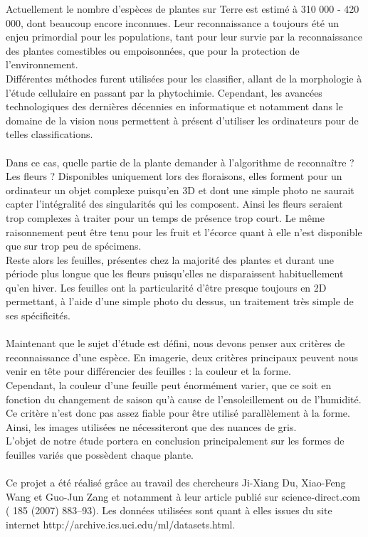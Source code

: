 Actuellement le nombre d'espèces de plantes sur Terre est estimé à 310 000 - 420 000, dont beaucoup encore inconnues. Leur reconnaissance a toujours été un enjeu primordial pour les populations, tant pour leur survie par la reconnaissance des plantes comestibles ou empoisonnées, que pour la protection de l'environnement. \\
Différentes méthodes furent utilisées pour les classifier, allant de la morphologie à l'étude cellulaire en passant par la phytochimie. Cependant, les avancées technologiques des dernières décennies en informatique et notamment dans le domaine de la vision nous permettent à présent d'utiliser les ordinateurs pour de telles classifications. \\
\\
Dans ce cas, quelle partie de la plante demander à l'algorithme de reconnaître ?
Les fleurs ? Disponibles uniquement lors des floraisons, elles forment pour un ordinateur un objet complexe puisqu'en 3D et dont une simple photo ne saurait capter l'intégralité des singularités qui les composent. Ainsi les fleurs seraient trop complexes à traiter pour un temps de présence trop court. 
Le même raisonnement peut être tenu pour les fruit et l'écorce quant à elle n'est disponible que sur trop peu de spécimens. \\
Reste alors les feuilles, présentes chez la majorité des plantes et durant une période plus longue que les fleurs puisqu'elles ne disparaissent habituellement qu'en hiver. Les feuilles ont la particularité d'être presque toujours en 2D permettant, à l'aide d'une simple photo du dessus, un traitement très simple de ses spécificités. \\
\\
Maintenant que le sujet d'étude est défini, nous devons penser aux critères de reconnaissance d'une espèce. En imagerie, deux critères principaux peuvent nous venir en tête pour différencier des feuilles : la couleur et la forme. \\
Cependant, la couleur d'une feuille peut énormément varier, que ce soit en fonction du changement de saison qu'à cause de l'ensoleillement ou de l'humidité. Ce critère n'est donc pas assez fiable pour être utilisé parallèlement à la forme. Ainsi, les images utilisées ne nécessiteront que des nuances de gris. \\
L'objet de notre étude portera en conclusion principalement sur les formes de feuilles variés que possèdent chaque plante.
\paragraph{}
Ce projet a été réalisé grâce au travail des chercheurs Ji-Xiang Du, Xiao-Feng Wang et Guo-Jun Zang et notamment à leur article publié sur science-direct.com ( 185 (2007) 883–93). Les données utilisées sont quant à elles issues du site internet http://archive.ics.uci.edu/ml/datasets.html.